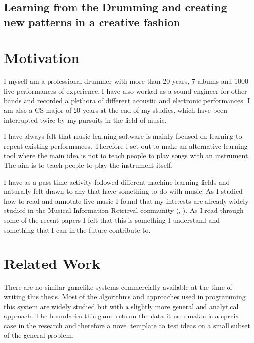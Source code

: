 \documentclass[10pt]{article}
\begin{document}
\iffalse 
\subsection{Handling Distorted Input Signals}
On a possible portable gaming device the microphone quality is usually low for recording a high sound pressure instrument such as the drums. In order to get reasonable separation of different drums we have to detect and declip clipped audio signal parts of the input. 
$x_{c}[n]=\{\begin{array}{rcl} x[n]&\\x[n]\end{array}$ 
\subsubsection{IHT}
Iterative Hard Threshold
\fi
 \subsection{Learning from the Drumming and creating new patterns in a creative fashion}
 
 \section{Motivation}
I myself am a professional drummer with more than 20 years, 7 albums and 1000 live performances of experience. I have also worked as a sound engineer for other bands and recorded a plethora of different acoustic and electronic performances. I am also a CS major of 20 years at the end of my studies, which have been interrupted twice by my pursuits in the field of music.

I have always felt that music learning software is mainly focused on learning to repeat existing performances. Therefore I set out to make an alternative learning tool where the main idea is not to teach people to play songs with an instrument. The aim is to teach people to play the instrument itself.

I have as a pass time activity followed different machine learning fields and naturally felt drawn to any that have something to do with music. As I studied how to read and annotate live music I found that my interests are already widely studied in the Musical Information Retrieval community (\cite{ismir}, \cite{mirex}). As I read through some of the recent papers I felt that this is something I understand and something that I can in the future contribute to.
\section{Related Work} 
There are no similar gamelike systems commercially available at the time of writing this thesis. Most of the algorithms and approaches used in programming this system are widely studied but with a slightly more general and analytical approach. The boundaries this game sets on the data it uses makes is a special case in the research and therefore a novel template to test ideas on a small subset of the general problem.
\end{document}
